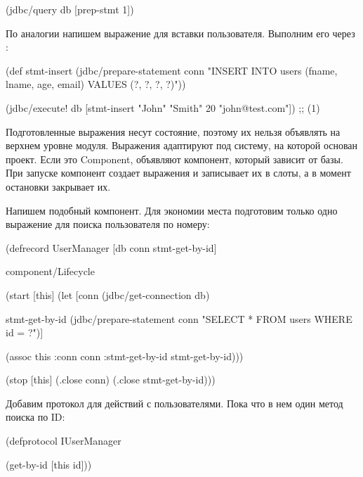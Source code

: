 \begin{english}
  \begin{clojure}
(jdbc/query db [prep-stmt 1])
  \end{clojure}
\end{english}

По аналогии напишем выражение для вставки пользователя. Выполним его через :

\begin{english}
  \begin{clojure}
(def stmt-insert
  (jdbc/prepare-statement conn
    "INSERT INTO users (fname, lname, age, email)
     VALUES (?, ?, ?, ?)"))

(jdbc/execute! db
  [stmt-insert "John" "Smith" 20 "john@test.com"])
;; (1)
  \end{clojure}
\end{english}


Подготовленные выражения несут состояние, поэтому их нельзя объявлять на верхнем уровне модуля. Выражения адаптируют под систему, на которой основан проект. Если это Component, объявляют компонент, который зависит от базы. При запуске компонент создает выражения и записывает их в слоты, а в момент остановки закрывает их.

Напишем подобный компонент. Для экономии места подготовим только одно выражение для поиска пользователя по номеру:

\begin{english}
  \begin{clojure}
(defrecord UserManager
    [db
     conn
     stmt-get-by-id]

  component/Lifecycle

  (start [this]
    (let [conn
          (jdbc/get-connection db)

          stmt-get-by-id
          (jdbc/prepare-statement conn
            "SELECT * FROM users WHERE id = ?")]

      (assoc this
             :conn conn
             :stmt-get-by-id stmt-get-by-id)))

  (stop [this]
    (.close conn)
    (.close stmt-get-by-id)))
  \end{clojure}
\end{english}

Добавим протокол для действий с пользователями. Пока что в нем один метод поиска по ID:

\begin{english}
  \begin{clojure}
(defprotocol IUserManager

  (get-by-id [this id]))
  \end{clojure}
\end{english}

